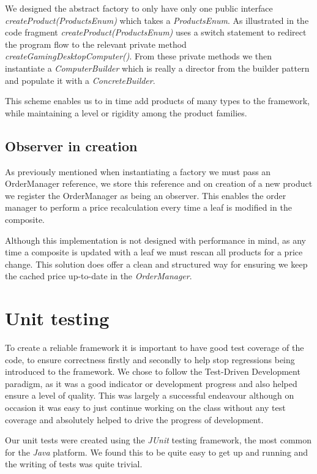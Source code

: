 \documentclass[pdftex,11pt,a4paper]{article}
\begin{document}
We designed the abstract factory to only have only one public interface \emph{createProduct(ProductsEnum)} which takes a \emph{ProductsEnum}. As illustrated in the code fragment \emph{createProduct(ProductsEnum)} uses a switch statement to redirect the program flow to the relevant private method \emph{createGamingDesktopComputer()}. From these private methods we then instantiate a \emph{ComputerBuilder} which is really a director from the builder pattern and populate it with a \emph{ConcreteBuilder}.

This scheme enables us to in time add products of many types to the framework, while maintaining a level or rigidity among the product families.



\subsection{Observer in creation}
As previously mentioned when instantiating a factory we must pass an OrderManager reference, we store this reference and on creation of a new product we register the OrderManager as being an observer. This enables the order manager to perform a price recalculation every time a leaf is modified in the composite.

Although this implementation is not designed with performance in mind, as any time a composite is updated with a leaf we must rescan all products for a price change. This solution does offer a clean and structured way for ensuring we keep the cached price up-to-date in the \emph{OrderManager}.

\pagebreak

\section{Unit testing}

To create a reliable framework it is important to have good test coverage of the code, to ensure correctness firstly and secondly to help stop regressions being introduced to the framework. We chose to follow the Test-Driven Development paradigm, as it was a good indicator or development progress and also helped ensure a level of quality. This was largely a successful endeavour although on occasion it was easy to just continue working on the class without any test coverage and absolutely helped to drive the progress of development.

Our unit tests were created using the \emph{JUnit} testing framework\cite{website:junit}, the most common for the \emph{Java} platform. We found this to be quite easy to get up and running and the writing of tests was quite trivial.
\end{document}
